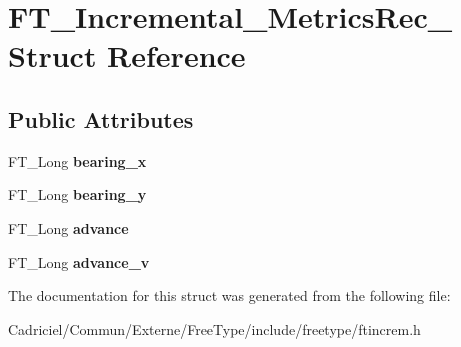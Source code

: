 \hypertarget{struct_f_t___incremental___metrics_rec__}{\section{F\-T\-\_\-\-Incremental\-\_\-\-Metrics\-Rec\-\_\- Struct Reference}
\label{struct_f_t___incremental___metrics_rec__}
}
\subsection*{Public Attributes}
\begin{DoxyCompactItemize}
\item 
\hypertarget{struct_f_t___incremental___metrics_rec___af065d998d0a0f2a57513125038d802a6}{F\-T\-\_\-\-Long {\bfseries bearing\-\_\-x}}\label{struct_f_t___incremental___metrics_rec___af065d998d0a0f2a57513125038d802a6}

\item 
\hypertarget{struct_f_t___incremental___metrics_rec___af1443aa7c1ca54d3c2a29f1cf6d7848b}{F\-T\-\_\-\-Long {\bfseries bearing\-\_\-y}}\label{struct_f_t___incremental___metrics_rec___af1443aa7c1ca54d3c2a29f1cf6d7848b}

\item 
\hypertarget{struct_f_t___incremental___metrics_rec___a996c99aa0e6b36c2c7776fc1a2b6b614}{F\-T\-\_\-\-Long {\bfseries advance}}\label{struct_f_t___incremental___metrics_rec___a996c99aa0e6b36c2c7776fc1a2b6b614}

\item 
\hypertarget{struct_f_t___incremental___metrics_rec___a0ee280662a03ea935dbfe377e56f4d6d}{F\-T\-\_\-\-Long {\bfseries advance\-\_\-v}}\label{struct_f_t___incremental___metrics_rec___a0ee280662a03ea935dbfe377e56f4d6d}

\end{DoxyCompactItemize}


The documentation for this struct was generated from the following file\-:\begin{DoxyCompactItemize}
\item 
Cadriciel/\-Commun/\-Externe/\-Free\-Type/include/freetype/ftincrem.\-h\end{DoxyCompactItemize}
